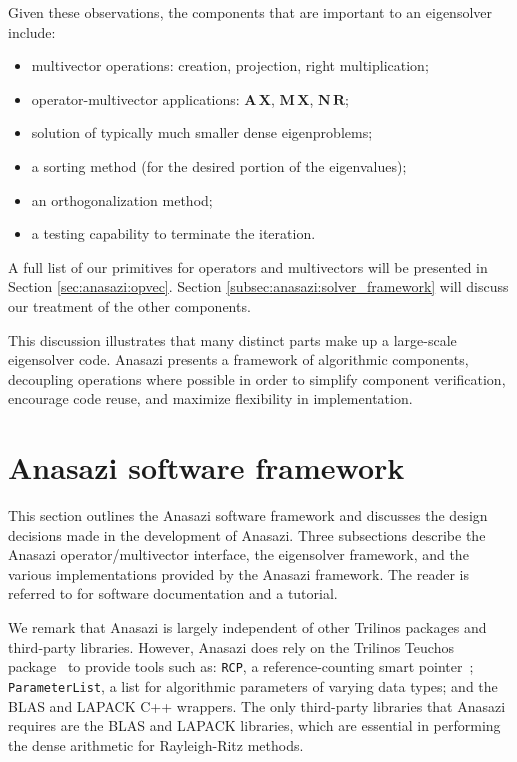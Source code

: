 \documentclass[acmtoms,acmnow]{acmtrans2m}
\begin{document}
Given these observations, the components that are important
to an eigensolver include:
\begin{itemize}
  \item multivector operations: creation,
        projection, right multiplication;
  \item operator-multivector applications:
        $\mathbf{A\,X}$, $\mathbf{M\,X}$, 
        $\mathbf{N\,R}$;
  \item solution of typically much smaller dense eigenproblems;
  \item a sorting method (for the desired portion of the
  eigenvalues);
  \item an orthogonalization method;
  \item a testing capability to terminate the iteration.
\end{itemize}
A full list of our primitives for operators and multivectors
will be presented in Section \ref{sec:anasazi:opvec}.
Section \ref{subsec:anasazi:solver_framework} will discuss
our treatment of the other components.

This discussion illustrates that many distinct parts make up
a large-scale eigensolver code.
Anasazi presents a framework of algorithmic components,
decoupling operations where possible in order to simplify
component verification, encourage code reuse, and maximize
flexibility in implementation.


\section{Anasazi software framework}
\label{sec:framework}

This section outlines the Anasazi software framework and discusses 
the design decisions made in the development of Anasazi. Three
subsections describe the Anasazi operator/multivector interface, the
eigensolver framework, and the various implementations provided by the
Anasazi framework. The reader is referred to
\cite{Trilinos:Anasazi,Trilinos-Tutorial} for software documentation
and a tutorial.

We remark that Anasazi is largely independent of other Trilinos packages and
third-party libraries. However, Anasazi does rely on the Trilinos Teuchos 
package~\cite{Trilinos:Teuchos} to provide tools such as: \texttt{RCP},
a reference-counting smart pointer~\cite{Detlefs:1992:GCR,Teuchos-RCP};
\texttt{ParameterList}, a list for algorithmic parameters of
varying data types; and the BLAS \cite{Lawson:1979:BLA,Blackford:2002:USB} 
and LAPACK \cite{abbd:95} C++ wrappers.
The only third-party libraries that Anasazi requires are the BLAS and
LAPACK libraries, which are essential in performing the dense arithmetic
for Rayleigh-Ritz methods.
\end{document}
